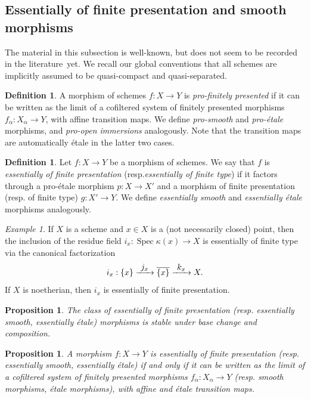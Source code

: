 \documentclass[11pt]{article}
\newcommand{\resp}{resp.\xspace}
\numberwithin{equation}{section}\renewcommand{\encodingdefault}{TU}
\def\To#1{\mathchoice{\xrightarrow{\textstyle\kern4pt#1\kern3pt}}{\stackrel{#1}{\longrightarrow}}{}{}}
\DeclareMathOperator{\spec}{Spec}
\newtheorem{prop}[thm]{Proposition}
\theoremstyle{remark}
\newtheorem{ex}[thm]{Example}
\theoremstyle{definition}
\newtheorem{df}[thm]{Definition}
\numberwithin{equation}{thm}
\begin{document}
\subsection{Essentially of finite presentation and smooth morphisms}

The material in this subsection is well-known, but does not seem to be recorded in the literature~yet.
We recall our global conventions that all schemes are implicitly assumed to be quasi-compact and quasi-separated.

\begin{df}\label{df:pro-etale}
A morphism of schemes $f : X \to Y$ is \emph{pro-finitely presented} if it can be written as the limit of a cofiltered system of finitely presented morphisms $f_\alpha : X_\alpha \to Y$, with affine transition maps.
We define \emph{pro-smooth} and \emph{pro-étale} morphisms, and \emph{pro-open immersions} analogously.
Note that the transition maps are automatically étale in the latter two cases.
\end{df}

\begin{df}\label{df:efp}
Let $f : X \to Y$ be a morphism of schemes.
We say that $f$ is \emph{essentially of finite presentation} (\resp \emph{essentially of finite type}) if it factors through a pro-étale morphism $p : X \to X'$ and a morphism of finite presentation (\resp of finite type) $g : X' \to Y$.
We define \emph{essentially smooth} and \emph{essentially étale} morphisms analogously.
\end{df}

\begin{ex}\label{ex:residue efp}
If $X$ is a scheme and $x \in X$ is a (not necessarily closed) point, then the inclusion of the residue field $i_x : \spec{\kappa(x)} \to X$ is essentially of finite type via the canonical factorization
\[
i_x : \{x\}
\To{j_x} \overline{\{x\}}
\To{k_x} X.
\]
If $X$ is noetherian, then $i_x$ is essentially of finite presentation.
\end{ex}

\begin{prop}\label{prop:efp compose}
The class of essentially of finite presentation (\resp essentially smooth, essentially étale) morphisms is stable under base change and composition.
\end{prop}

\begin{prop}\label{prop:pro-fp=efp}
A morphism $f : X \to Y$ is essentially of finite presentation (\resp essentially smooth, essentially étale) if and only if it can be written as the limit of a cofiltered system of finitely presented morphisms $f_\alpha : X_\alpha \to Y$ (\resp smooth morphisms, étale morphisms), with affine and \emph{étale} transition maps.
\end{prop}
\end{document}
